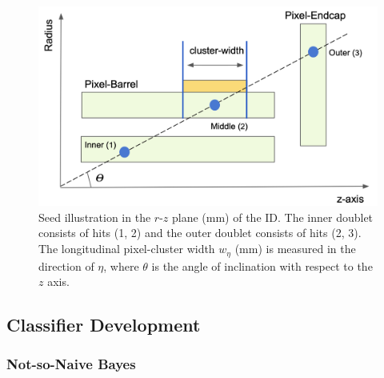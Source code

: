 



\begin{figure}[!htbp]
\centering
    \includegraphics[width=0.83\linewidth]{images/4-ml-based-predictor/triplet_illustation.png}
    \caption{Seed illustration in the $r$-$z$ plane (mm) of the ID. The inner doublet consists of hits (1, 2) and the outer doublet consists of hits (2, 3). The longitudinal pixel-cluster width $w_{\eta}$ (mm) is measured in the direction of $\eta$, where $\theta$ is the angle of inclination with respect to the $z$ axis.}
\label{fig:triplet-illustration}
\end{figure}


\subsection{Classifier Development}
\label{section:classifier-dev}

\subsubsection{Not-so-Naive Bayes}

